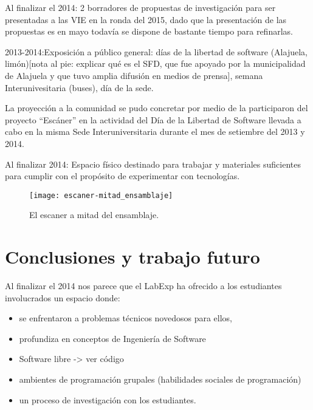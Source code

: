 \documentclass[conference]{IEEEtran}
\begin{document}
Al finalizar el 2014: 2 borradores de propuestas de investigación para ser
presentadas a las VIE en la ronda del 2015, dado que la presentación de las
propuestas es en mayo todavía se dispone de bastante tiempo para refinarlas. 

2013-2014:Exposición a público general: días de la libertad de software
(Alajuela, limón)[nota al pie: explicar qué es el SFD, que fue apoyado por la
municipalidad de Alajuela y que tuvo amplia difusión en medios de prensa],
semana Interunivesitaria (buses), día de la sede. 

La proyección a la comunidad se pudo concretar por medio de la participaron del
proyecto “Escáner” en la actividad del Día de la Libertad de Software llevada a
cabo en la misma Sede Interuniversitaria durante el mes de setiembre del 2013 y
2014.

Al finalizar 2014: Espacio físico destinado para trabajar y materiales
suficientes para cumplir con el propósito de experimentar con tecnologías.  

\begin{figure}[!t]
\centering
\texttt{[image: escaner-mitad\_ensamblaje]}
\caption{El escaner a mitad del ensamblaje.}
\label{escaner}
\end{figure}





\section{Conclusiones y trabajo futuro}

Al finalizar el 2014 nos parece que el LabExp ha ofrecido a los estudiantes involucrados un espacio donde:

\begin{itemize}
    \item se enfrentaron a problemas técnicos novedosos para ellos, 
    \item profundiza en conceptos de Ingeniería de Software
    \item Software libre -> ver código
    \item ambientes de programación grupales (habilidades sociales de programación)
    \item un proceso de investigación con los estudiantes.
\end{itemize}
\end{document}
